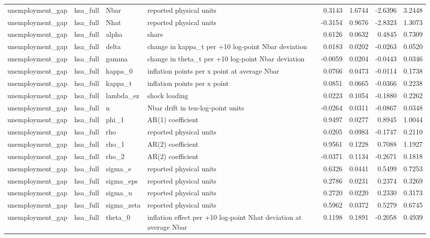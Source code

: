 \begin{tabular}{llllrrrr}
unemployment\_gap & hsa\_full & Nbar & reported physical units & 0.3143 & 1.6744 & -2.6396 & 3.2448 \\
unemployment\_gap & hsa\_full & Nhat & reported physical units & -0.3154 & 0.9676 & -2.8323 & 1.3073 \\
unemployment\_gap & hsa\_full & alpha & share & 0.6126 & 0.0632 & 0.4845 & 0.7309 \\
unemployment\_gap & hsa\_full & delta & change in kappa\_t per +10 log-point Nbar deviation & 0.0183 & 0.0202 & -0.0263 & 0.0520 \\
unemployment\_gap & hsa\_full & gamma & change in theta\_t per +10 log-point Nbar deviation & -0.0059 & 0.0204 & -0.0443 & 0.0346 \\
unemployment\_gap & hsa\_full & kappa\_0 & inflation points per x point at average Nbar & 0.0766 & 0.0473 & -0.0114 & 0.1738 \\
unemployment\_gap & hsa\_full & kappa\_t & inflation points per x point & 0.0851 & 0.0665 & -0.0366 & 0.2238 \\
unemployment\_gap & hsa\_full & lambda\_ez & shock loading & 0.0223 & 0.1054 & -0.1880 & 0.2262 \\
unemployment\_gap & hsa\_full & n & Nbar drift in ten-log-point units & -0.0264 & 0.0311 & -0.0867 & 0.0348 \\
unemployment\_gap & hsa\_full & phi\_1 & AR(1) coefficient & 0.9497 & 0.0277 & 0.8945 & 1.0044 \\
unemployment\_gap & hsa\_full & rho & reported physical units & 0.0205 & 0.0983 & -0.1747 & 0.2110 \\
unemployment\_gap & hsa\_full & rho\_1 & AR(2) coefficient & 0.9561 & 0.1228 & 0.7088 & 1.1927 \\
unemployment\_gap & hsa\_full & rho\_2 & AR(2) coefficient & -0.0371 & 0.1134 & -0.2671 & 0.1818 \\
unemployment\_gap & hsa\_full & sigma\_e & reported physical units & 0.6326 & 0.0441 & 0.5499 & 0.7253 \\
unemployment\_gap & hsa\_full & sigma\_eps & reported physical units & 0.2786 & 0.0231 & 0.2374 & 0.3269 \\
unemployment\_gap & hsa\_full & sigma\_u & reported physical units & 0.2720 & 0.0220 & 0.2330 & 0.3173 \\
unemployment\_gap & hsa\_full & sigma\_zeta & reported physical units & 0.5962 & 0.0372 & 0.5279 & 0.6745 \\
unemployment\_gap & hsa\_full & theta\_0 & inflation effect per +10 log-point Nhat deviation at average Nbar & 0.1198 & 0.1891 & -0.2058 & 0.4939 \\

\end{tabular}
